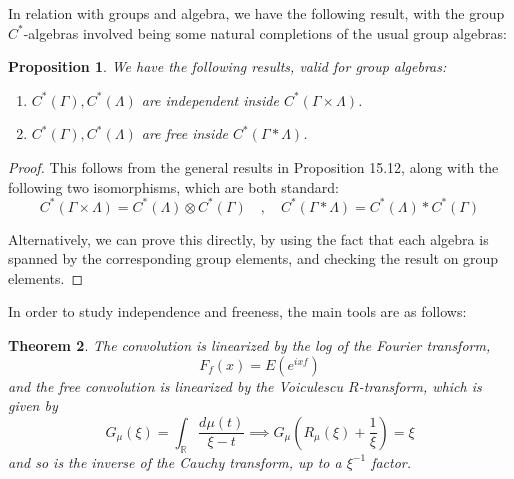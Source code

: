 \documentclass[12pt]{amsbook}
\newtheorem{theorem}{Theorem}[chapter]
\newtheorem{proposition}[theorem]{Proposition}
\begin{document}
In relation with groups and algebra, we have the following result, with the group $C^*$-algebras involved being some natural completions of the usual group algebras:

\begin{proposition}
We have the following results, valid for group algebras:
\begin{enumerate}
\item $C^*(\Gamma),C^*(\Lambda)$ are independent inside $C^*(\Gamma\times\Lambda)$.

\item $C^*(\Gamma),C^*(\Lambda)$ are free inside $C^*(\Gamma*\Lambda)$.
\end{enumerate}
\end{proposition}

\begin{proof}
This follows from the general results in Proposition 15.12, along with the following two isomorphisms, which are both standard:
$$C^*(\Gamma\times\Lambda)=C^*(\Lambda)\otimes C^*(\Gamma)\quad,\quad 
C^*(\Gamma*\Lambda)=C^*(\Lambda)*C^*(\Gamma)$$

Alternatively, we can prove this directly, by using the fact that each algebra is spanned by the corresponding group elements, and checking the result on group elements.
\end{proof}

In order to study independence and freeness, the main tools are as follows: 


\begin{theorem}
The convolution is linearized by the log of the Fourier transform,
$$F_f(x)=E(e^{ixf})$$
and the free convolution is linearized by the Voiculescu $R$-transform, which is given by
$$G_\mu(\xi)=\int_\mathbb R\frac{d\mu(t)}{\xi-t}\implies G_\mu\left(R_\mu(\xi)+\frac{1}{\xi}\right)=\xi$$
and so is the inverse of the Cauchy transform, up to a $\xi^{-1}$ factor.
\end{theorem}
\end{document}
